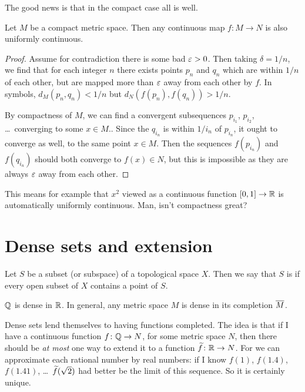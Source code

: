The good news is that in the compact case all is well.
\begin{theorem}
	Let $M$ be a compact metric space.
	Then any continuous map $f \colon M \to N$ is
	also uniformly continuous.
\end{theorem}
\begin{proof}
	Assume for contradiction there is some bad $\varepsilon > 0$.
	Then taking $\delta = 1/n$,
	we find that for each integer $n$
	there exists points $p_n$ and $q_n$
	which are within $1/n$ of each other,
	but are mapped more than $\varepsilon$ away from each other by $f$.
	In symbols, $d_M(p_n, q_n) < 1/n$ but $d_N(f(p_n), f(q_n)) > 1/n$.

	By compactness of $M$,
	we can find a convergent subsequences
	$p_{i_1}$, $p_{i_2}$, \dots\ converging to some $x \in M$..
	Since the $q_{i_n}$ is within $1/i_n$ of $p_{i_n}$,
	it ought to converge as well, to the same point $x \in M$.
	Then the sequences $f(p_{i_n})$ and $f(q_{i_n})$
	should both converge to $f(x) \in N$,
	but this is impossible as they are always $\varepsilon$
	away from  each other.
\end{proof}
This means for example that $x^2$ viewed
as a continuous function $[0,1] \to \mathbb R$ is automatically
uniformly continuous.
Man, isn't compactness great?

\section{Dense sets and extension}

\begin{definition}
	Let $S$ be a subset (or subspace) of a topological space $X$.
	Then we say that $S$ is 
	if every open subset of $X$ contains a point of $S$.
\end{definition}

\begin{example}
	\listhack
	\begin{enumerate}[(a)]
		\ii $\mathbb Q$ is dense in $\mathbb R$.
		\ii In general, any metric space $M$ is dense
		in its completion $\overline M$.
	\end{enumerate}
\end{example}

Dense sets lend themselves to having functions completed.
The idea is that if I have a continuous function
$f \colon \mathbb Q \to N$, for some metric space $N$,
then there should be \emph{at most} one way to extend it to a function
$\widetilde f \colon \mathbb R \to N$.
For we can approximate each rational number by real numbers:
if I know $f(1)$, $f(1.4)$, $f(1.41)$, \dots\
$\widetilde f(\sqrt2)$ had better be the limit of this sequence.
So it is certainly unique.

